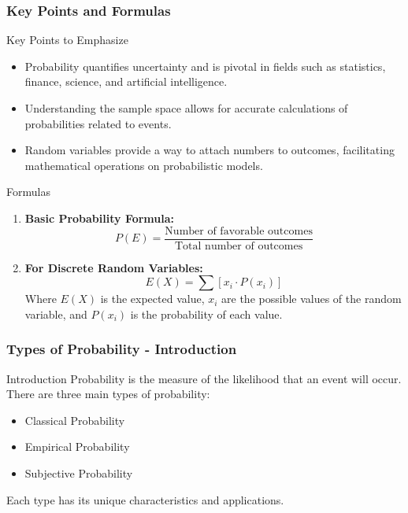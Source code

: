 \documentclass[aspectratio=169]{beamer}
\begin{document}
\begin{frame}[fragile]
    \frametitle{Key Points and Formulas}
    \begin{block}{Key Points to Emphasize}
        \begin{itemize}
            \item Probability quantifies uncertainty and is pivotal in fields such as statistics, finance, science, and artificial intelligence.
            \item Understanding the sample space allows for accurate calculations of probabilities related to events.
            \item Random variables provide a way to attach numbers to outcomes, facilitating mathematical operations on probabilistic models.
        \end{itemize}
    \end{block}

    \begin{block}{Formulas}
        \begin{enumerate}
            \item \textbf{Basic Probability Formula:}
            \begin{equation}
                P(E) = \frac{\text{Number of favorable outcomes}}{\text{Total number of outcomes}}
            \end{equation}
            \item \textbf{For Discrete Random Variables:}
            \begin{equation}
                E(X) = \sum [x_i \cdot P(x_i)]
            \end{equation}
            Where \( E(X) \) is the expected value, \( x_i \) are the possible values of the random variable, and \( P(x_i) \) is the probability of each value.
        \end{enumerate}
    \end{block}
\end{frame}

\begin{frame}[fragile]
    \frametitle{Types of Probability - Introduction}
    \begin{block}{Introduction}
        Probability is the measure of the likelihood that an event will occur. There are three main types of probability:
        \begin{itemize}
            \item Classical Probability
            \item Empirical Probability
            \item Subjective Probability
        \end{itemize}
        Each type has its unique characteristics and applications.
    \end{block}
\end{frame}
\end{document}
